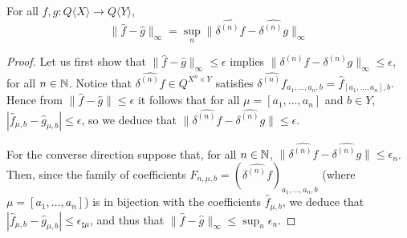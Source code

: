\begin{proposition}\label{prop:taylormetric}
For all $f,g:Q\langle X\rangle \to Q\langle Y\rangle$, 
$$
\| \widehat f-\widehat g\|_{\infty}= \sup_{n}\| \widehat{\delta^{(n)}f} -\widehat{\delta^{(n)}g}\|_{\infty}
$$
\end{proposition}
\begin{proof}
Let us first show that $\| \widehat f-\widehat g\|_{\infty}\leq \epsilon$ implies 
$\| \delta^{(n)}f-\delta^{(n)}g\|_{\infty}\leq\epsilon$, for all $n\in \mathbb{N}$. 
Notice that $\widehat{\delta^{(n)}f}\in Q^{X^{n}\times Y}$ satisfies 
$\widehat{\delta^{(n)}f}_{a_{1},\dots, a_{n},b}= \widehat f_{[a_{1},\dots, a_{n}],b}$. Hence 
from $\| \widehat f-\widehat g\|\leq\epsilon$ it follows that for all $\mu=[a_{1},\dots, a_{n}]$ and $b\in Y$, 
$|\widehat f_{\mu,b}- \widehat g_{\mu,b}|\leq \epsilon$, so 
we deduce that $\| \widehat{\delta^{(n)}f}- \widehat{\delta^{(n)}g}\|\leq \epsilon$.

For the converse direction suppose that, for all $n\in \mathbb{N}$, $\| \widehat{\delta^{(n)}f}- \widehat{\delta^{(n)}g}\|\leq \epsilon_{n}$. Then, since the family of coefficients $
F_{n,\mu,b}=
( \widehat{\delta^{(n)}f})_{a_{1},\dots, a_{n},b}$ (where $\mu=[a_{1},\dots, a_{n}]$) is in bijection with the coefficients $\widehat f_{\mu,b}$, we deduce that $|\widehat f_{\mu,b}-\widehat g_{\mu,b}|\leq 
\epsilon_{\sharp \mu  }$, and thus that 
$\| \widehat f-\widehat g\|_{\infty}\leq \sup_{n}\epsilon_{n}$. 
\end{proof}

